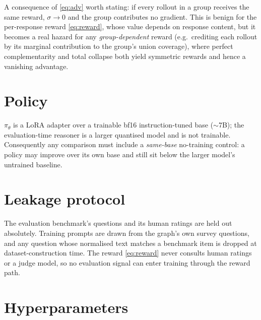 \documentclass[11pt]{article}
\newcommand{\pol}{\pi_\theta}
\begin{document}
A consequence of \eqref{eq:adv} worth stating: if every rollout in a group
receives the same reward, $\sigma\to 0$ and the group contributes no gradient.
This is benign for the per-response reward \eqref{eq:reward}, whose value
depends on response content, but it becomes a real hazard for any
\emph{group-dependent} reward (e.g.\ crediting each rollout by its marginal
contribution to the group's union coverage), where perfect complementarity and
total collapse both yield symmetric rewards and hence a vanishing advantage.

\section{Policy}

$\pol$ is a LoRA adapter over a trainable bf16 instruction-tuned base
($\sim$7B); the evaluation-time reasoner is a larger quantised model and is not
trainable. Consequently any comparison must include a \emph{same-base}
no-training control: a policy may improve over its own base and still sit below
the larger model's untrained baseline.

\section{Leakage protocol}

The evaluation benchmark's questions and its human ratings are held out
absolutely. Training prompts are drawn from the graph's own survey questions,
and any question whose normalised text matches a benchmark item is dropped at
dataset-construction time. The reward \eqref{eq:reward} never consults human
ratings or a judge model, so no evaluation signal can enter training through the
reward path.

\section{Hyperparameters}
\end{document}
